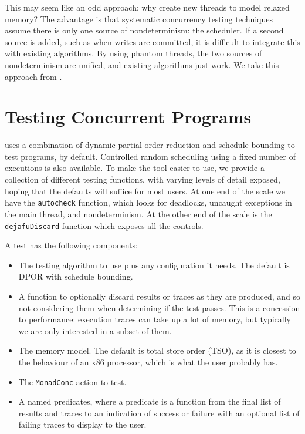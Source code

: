 This may seem like an odd approach: why create new threads to model relaxed
memory?  The advantage is that systematic concurrency testing techniques assume
there is only one source of nondeterminism: the scheduler.  If a second source
is added, such as when writes are committed, it is difficult to integrate this
with existing algorithms.  By using phantom threads, the two sources of
nondeterminism are unified, and existing algorithms just work.  We take this
approach from \cite{zhang2015}.

\section{Testing Concurrent Programs}
\label{sec:dejafu-testing}

\dejafu{} uses a combination of dynamic partial-order reduction and
schedule bounding to test programs, by default.  Controlled random
scheduling using a fixed number of executions is also available.  To
make the tool easier to use, we provide a collection of different
testing functions, with varying levels of detail exposed, hoping that
the defaults will suffice for most users.  At one end of the scale we
have the \verb|autocheck| function, which looks for deadlocks,
uncaught exceptions in the main thread, and nondeterminism.  At the
other end of the scale is the \verb|dejafuDiscard| function which
exposes all the controls.

A \dejafu{} test has the following components:

\begin{itemize}
\item The testing algorithm to use plus any configuration it needs.
  The default is DPOR with schedule bounding.
\item A function to optionally discard results or traces as they are
  produced, and so not considering them when determining if the test
  passes.  This is a concession to performance: execution traces can
  take up a lot of memory, but typically we are only interested in a
  subset of them.
\item The memory model.  The default is total store order (TSO), as it
  is closest to the behaviour of an x86 processor\cite{owens2009},
  which is what the user probably has.
\item The \verb|MonadConc| action to test.
\item A named predicates, where a predicate is a function from the
  final list of results and traces to an indication of success or
  failure with an optional list of failing traces to display to the
  user.
\end{itemize}

